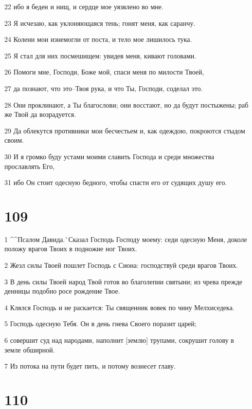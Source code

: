 \par 22 ибо я беден и нищ, и сердце мое уязвлено во мне.
\par 23 Я исчезаю, как уклоняющаяся тень; гонят меня, как саранчу.
\par 24 Колени мои изнемогли от поста, и тело мое лишилось тука.
\par 25 Я стал для них посмешищем: увидев меня, кивают головами.
\par 26 Помоги мне, Господи, Боже мой, спаси меня по милости Твоей,
\par 27 да познают, что это--Твоя рука, и что Ты, Господи, соделал это.
\par 28 Они проклинают, а Ты благослови; они восстают, но да будут постыжены; раб же Твой да возрадуется.
\par 29 Да облекутся противники мои бесчестьем и, как одеждою, покроются стыдом своим.
\par 30 И я громко буду устами моими славить Господа и среди множества прославлять Его,
\par 31 ибо Он стоит одесную бедного, чтобы спасти его от судящих душу его.

\chapter{109}

\par 1 ^^Псалом Давида.^^ Сказал Господь Господу моему: седи одесную Меня, доколе положу врагов Твоих в подножие ног Твоих.
\par 2 Жезл силы Твоей пошлет Господь с Сиона: господствуй среди врагов Твоих.
\par 3 В день силы Твоей народ Твой готов во благолепии святыни; из чрева прежде денницы подобно росе рождение Твое.
\par 4 Клялся Господь и не раскается: Ты священник вовек по чину Мелхиседека.
\par 5 Господь одесную Тебя. Он в день гнева Своего поразит царей;
\par 6 совершит суд над народами, наполнит [землю] трупами, сокрушит голову в земле обширной.
\par 7 Из потока на пути будет пить, и потому вознесет главу.

\chapter{110}

